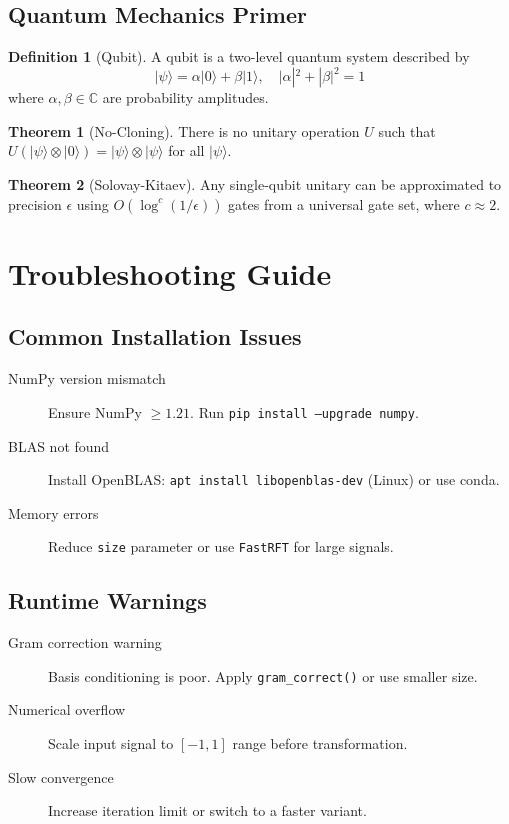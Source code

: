 \documentclass[11pt, a4paper, openany]{book}
\theoremstyle{definition}
\newtheorem{definition}{Definition}[chapter]
\newtheorem{theorem}{Theorem}[chapter]
\begin{document}
\section{Quantum Mechanics Primer}
\begin{definition}[Qubit]
A qubit is a two-level quantum system described by
\begin{equation}
|\psi\rangle = \alpha|0\rangle + \beta|1\rangle, \quad |\alpha|^2 + |\beta|^2 = 1
\end{equation}
where $\alpha, \beta \in \mathbb{C}$ are probability amplitudes.
\end{definition}

\begin{theorem}[No-Cloning]
There is no unitary operation $U$ such that $U(|\psi\rangle \otimes |0\rangle) = |\psi\rangle \otimes |\psi\rangle$ for all $|\psi\rangle$.
\end{theorem}

\begin{theorem}[Solovay-Kitaev]
Any single-qubit unitary can be approximated to precision $\epsilon$ using $O(\log^c(1/\epsilon))$ gates from a universal gate set, where $c \approx 2$.
\end{theorem}

\chapter{Troubleshooting Guide}

\section{Common Installation Issues}
\begin{description}
    \item[NumPy version mismatch] Ensure NumPy $\geq 1.21$. Run \texttt{pip install --upgrade numpy}.
    \item[BLAS not found] Install OpenBLAS: \texttt{apt install libopenblas-dev} (Linux) or use conda.
    \item[Memory errors] Reduce \texttt{size} parameter or use \texttt{FastRFT} for large signals.
\end{description}

\section{Runtime Warnings}
\begin{description}
    \item[Gram correction warning] Basis conditioning is poor. Apply \texttt{gram\_correct()} or use smaller size.
    \item[Numerical overflow] Scale input signal to $[-1, 1]$ range before transformation.
    \item[Slow convergence] Increase iteration limit or switch to a faster variant.
\end{description}
\end{document}
